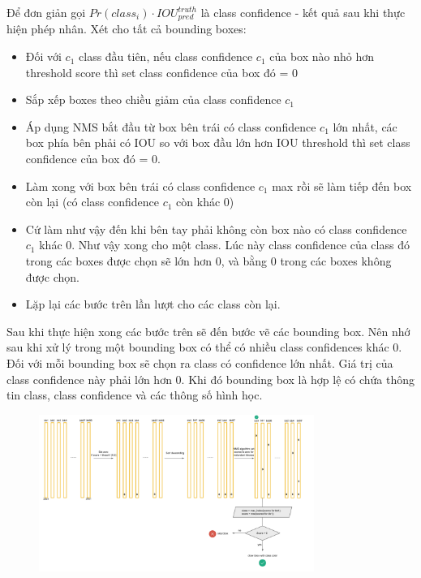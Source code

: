 Để đơn giản gọi $Pr(class_i) \cdot IOU_{pred}^{truth}$ là class confidence - kết quả sau khi thực hiện phép nhân. Xét cho tất cả bounding boxes:
\begin{itemize}
    \item Đối với $c_1$ class đầu tiên, nếu class confidence $c_1$ 
 của box nào nhỏ hơn threshold score thì set class confidence của box đó = 0
 \item Sắp xếp boxes theo chiều giảm của class confidence $c_1$
 \item Áp dụng NMS bắt đầu từ box bên trái có class confidence 
 $c_1$ lớn nhất, các box phía bên phải có IOU so với box đầu lớn hơn IOU threshold thì set class confidence của box đó = 0.
 \item Làm xong với box bên trái có class confidence $c_1$
 max rồi sẽ làm tiếp đến box còn lại (có class confidence $c_1$
 còn khác 0)
\item Cứ làm như vậy đến khi bên tay phải không còn box nào có class confidence $c_1$ khác 0. Như vậy xong cho một class. Lúc này class confidence của class đó trong các boxes được chọn sẽ lớn hơn 0, và bằng 0 trong các boxes không được chọn.
\item Lặp lại các bước trên lần lượt cho các class còn lại.
\end{itemize}
Sau khi thực hiện xong các bước trên sẽ đến bước vẽ các bounding box. Nên nhớ sau khi xử lý trong một bounding box có thể có nhiều class confidences khác 0. Đối với mỗi bounding box sẽ chọn ra class có confidence lớn nhất. Giá trị của class confidence này phải lớn hơn 0. Khi đó bounding box là hợp lệ có chứa thông tin class, class confidence và các thông số hình học.
\begin{figure}[htbp]
        \centering
        \includegraphics[width=0.8\textwidth]{images/2a-sign/yolo1_nms2.png}
\end{figure}

